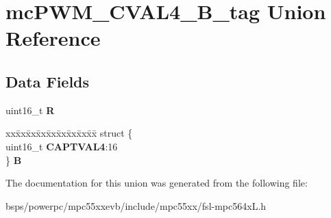 \hypertarget{unionmcPWM__CVAL4__16B__tag}{}\section{mc\+P\+W\+M\+\_\+\+C\+V\+A\+L4\+\_\+B\+\_\+tag Union Reference}
\label{unionmcPWM__CVAL4__16B__tag}
\subsection*{Data Fields}
\begin{DoxyCompactItemize}
\item 
\mbox{\label{unionmcPWM__CVAL4__16B__tag_a950d0657d99fc7268d8a57b4561358ca}} 
uint16\+\_\+t {\bfseries R}
\item 
\mbox{\label{unionmcPWM__CVAL4__16B__tag_ad553ea550f8c6e7e2a77a922ed99cb71}} 
\begin{tabbing}
xx\=xx\=xx\=xx\=xx\=xx\=xx\=xx\=xx\=\kill
struct \{\\
\>uint16\_t {\bfseries CAPTVAL4}:16\\
\} {\bfseries B}\\

\end{tabbing}\end{DoxyCompactItemize}


The documentation for this union was generated from the following file\+:\begin{DoxyCompactItemize}
\item 
bsps/powerpc/mpc55xxevb/include/mpc55xx/fsl-\/mpc564x\+L.\+h\end{DoxyCompactItemize}
